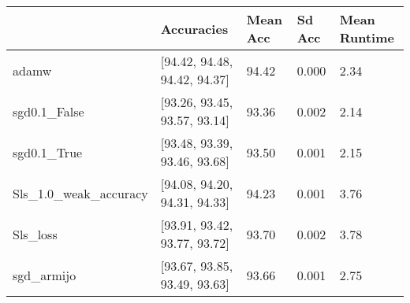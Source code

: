 \begin{tabular}{lllll}
\toprule
{} &                    Accuracies & Mean Acc & Sd Acc & Mean Runtime \\
\midrule
adamw                 &  [94.42, 94.48, 94.42, 94.37] &    94.42 &  0.000 &         2.34 \\
sgd0.1\_False          &  [93.26, 93.45, 93.57, 93.14] &    93.36 &  0.002 &         2.14 \\
sgd0.1\_True           &  [93.48, 93.39, 93.46, 93.68] &    93.50 &  0.001 &         2.15 \\
Sls\_1.0\_weak\_accuracy &  [94.08, 94.20, 94.31, 94.33] &    94.23 &  0.001 &         3.76 \\
Sls\_loss              &  [93.91, 93.42, 93.77, 93.72] &    93.70 &  0.002 &         3.78 \\
sgd\_armijo            &  [93.67, 93.85, 93.49, 93.63] &    93.66 &  0.001 &         2.75 \\
\bottomrule
\end{tabular}
